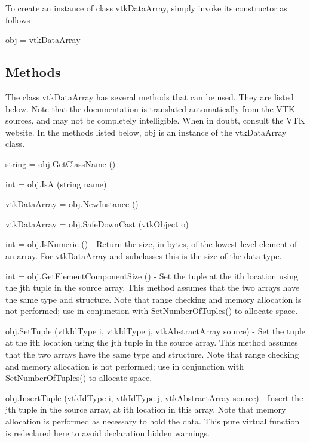 To create an instance of class vtk\-Data\-Array, simply invoke its constructor as follows \begin{DoxyVerb}  obj = vtkDataArray
\end{DoxyVerb}
 \hypertarget{vtkwidgets_vtkxyplotwidget_Methods}{}\subsection{Methods}\label{vtkwidgets_vtkxyplotwidget_Methods}
The class vtk\-Data\-Array has several methods that can be used. They are listed below. Note that the documentation is translated automatically from the V\-T\-K sources, and may not be completely intelligible. When in doubt, consult the V\-T\-K website. In the methods listed below, {\ttfamily obj} is an instance of the vtk\-Data\-Array class. 
\begin{DoxyItemize}
\item {\ttfamily string = obj.\-Get\-Class\-Name ()}  
\item {\ttfamily int = obj.\-Is\-A (string name)}  
\item {\ttfamily vtk\-Data\-Array = obj.\-New\-Instance ()}  
\item {\ttfamily vtk\-Data\-Array = obj.\-Safe\-Down\-Cast (vtk\-Object o)}  
\item {\ttfamily int = obj.\-Is\-Numeric ()} -\/ Return the size, in bytes, of the lowest-\/level element of an array. For vtk\-Data\-Array and subclasses this is the size of the data type.  
\item {\ttfamily int = obj.\-Get\-Element\-Component\-Size ()} -\/ Set the tuple at the ith location using the jth tuple in the source array. This method assumes that the two arrays have the same type and structure. Note that range checking and memory allocation is not performed; use in conjunction with Set\-Number\-Of\-Tuples() to allocate space.  
\item {\ttfamily obj.\-Set\-Tuple (vtk\-Id\-Type i, vtk\-Id\-Type j, vtk\-Abstract\-Array source)} -\/ Set the tuple at the ith location using the jth tuple in the source array. This method assumes that the two arrays have the same type and structure. Note that range checking and memory allocation is not performed; use in conjunction with Set\-Number\-Of\-Tuples() to allocate space.  
\item {\ttfamily obj.\-Insert\-Tuple (vtk\-Id\-Type i, vtk\-Id\-Type j, vtk\-Abstract\-Array source)} -\/ Insert the jth tuple in the source array, at ith location in this array. Note that memory allocation is performed as necessary to hold the data. This pure virtual function is redeclared here to avoid declaration hidden warnings.  

\end{DoxyItemize}
